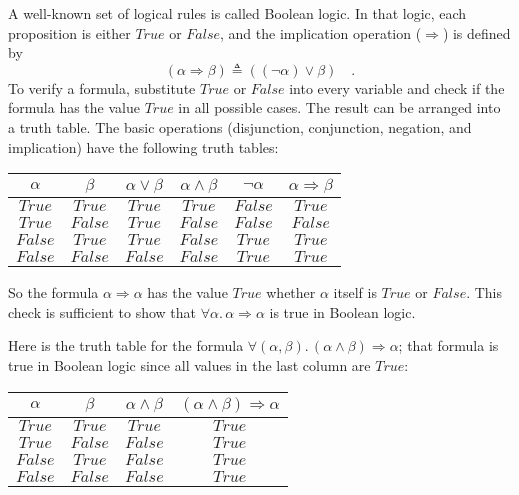 A well-known set of logical rules is called Boolean
logic. In that logic, each proposition is either $True$ or $False$,
and the implication operation ($\Rightarrow$) is defined by 
\begin{equation}
\left(\alpha\Rightarrow\beta\right)\triangleq\left((\neg\alpha)\vee\beta\right)\quad.\label{eq:ch-definition-of-implication-in-Boolean-logic}
\end{equation}
To verify a formula, substitute $True$ or $False$ into every variable
and check if the formula has the value $True$ in all possible cases.
The result can be arranged into a truth table.
The basic operations (disjunction, conjunction, negation, and implication)
have the following truth tables:
\begin{center}
{\small{}}%
\begin{tabular}{|c|c|c|c|c|c|}
\hline 
{\small{}$\alpha$} & {\small{}$\beta$} & \textbf{\small{}$\alpha\vee\beta$} & \textbf{\small{}$\alpha\wedge\beta$} & \textbf{\small{}$\neg\alpha$} & \textbf{\small{}$\alpha\Rightarrow\beta$}\tabularnewline
\hline 
\hline 
{\small{}$True$} & {\small{}$True$} & {\small{}$True$} & {\small{}$True$} & {\small{}$False$} & {\small{}$True$}\tabularnewline
\hline 
{\small{}$True$} & {\small{}$False$} & {\small{}$True$} & {\small{}$False$} & {\small{}$False$} & {\small{}$False$}\tabularnewline
\hline 
{\small{}$False$} & {\small{}$True$} & {\small{}$True$} & {\small{}$False$} & {\small{}$True$} & {\small{}$True$}\tabularnewline
\hline 
{\small{}$False$} & {\small{}$False$} & {\small{}$False$} & {\small{}$False$} & {\small{}$True$} & {\small{}$True$}\tabularnewline
\hline 
\end{tabular}{\small\par}
\par\end{center}

So the formula $\alpha\Rightarrow\alpha$ has the value $True$ whether
$\alpha$ itself is $True$ or $False$. This check is sufficient
to show that $\forall\alpha.\,\alpha\Rightarrow\alpha$ is true in
Boolean logic.

Here is the truth table for the formula $\forall(\alpha,\beta).\,(\alpha\wedge\beta)\Rightarrow\alpha$;
that formula is true in Boolean logic since all values in the last
column are $True$:
\begin{center}
{\small{}}%
\begin{tabular}{|c|c|c|c|}
\hline 
{\small{}$\alpha$} & {\small{}$\beta$} & \textbf{\small{}$\alpha\wedge\beta$} & {\small{}$(\alpha\wedge\beta)\Rightarrow\alpha$}\tabularnewline
\hline 
\hline 
{\small{}$True$} & {\small{}$True$} & {\small{}$True$} & {\small{}$True$}\tabularnewline
\hline 
{\small{}$True$} & {\small{}$False$} & {\small{}$False$} & {\small{}$True$}\tabularnewline
\hline 
{\small{}$False$} & {\small{}$True$} & {\small{}$False$} & {\small{}$True$}\tabularnewline
\hline 
{\small{}$False$} & {\small{}$False$} & {\small{}$False$} & {\small{}$True$}\tabularnewline
\hline 
\end{tabular}{\small\par}
\par\end{center}

